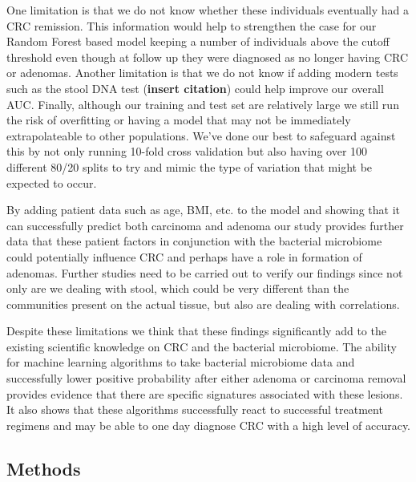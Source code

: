 \documentclass[12pt,]{article}
\begin{document}
One limitation is that we do not know whether these individuals
eventually had a CRC remission. This information would help to
strengthen the case for our Random Forest based model keeping a number
of individuals above the cutoff threshold even though at follow up they
were diagnosed as no longer having CRC or adenomas. Another limitation
is that we do not know if adding modern tests such as the stool DNA test
(\textbf{insert citation}) could help improve our overall AUC. Finally,
although our training and test set are relatively large we still run the
risk of overfitting or having a model that may not be immediately
extrapolateable to other populations. We've done our best to safeguard
against this by not only running 10-fold cross validation but also
having over 100 different 80/20 splits to try and mimic the type of
variation that might be expected to occur.

By adding patient data such as age, BMI, etc. to the model and showing
that it can successfully predict both carcinoma and adenoma our study
provides further data that these patient factors in conjunction with the
bacterial microbiome could potentially influence CRC and perhaps have a
role in formation of adenomas. Further studies need to be carried out to
verify our findings since not only are we dealing with stool, which
could be very different than the communities present on the actual
tissue, but also are dealing with correlations.

Despite these limitations we think that these findings significantly add
to the existing scientific knowledge on CRC and the bacterial
microbiome. The ability for machine learning algorithms to take
bacterial microbiome data and successfully lower positive probability
after either adenoma or carcinoma removal provides evidence that there
are specific signatures associated with these lesions. It also shows
that these algorithms successfully react to successful treatment
regimens and may be able to one day diagnose CRC with a high level of
accuracy.

\newpage

\subsection{Methods}\label{methods}
\end{document}

